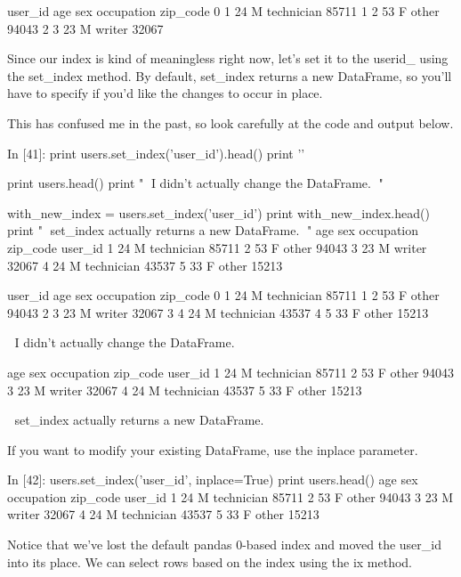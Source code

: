    user_id  age sex  occupation zip_code
0        1   24   M  technician    85711
1        2   53   F       other    94043
2        3   23   M      writer    32067

Since our index is kind of meaningless right now, let's set it to the userid_ using the set_index method. By default, set_index returns a new DataFrame, so you'll have to specify if you'd like the changes to occur in place.

This has confused me in the past, so look carefully at the code and output below.

In [41]:
print users.set_index('user_id').head()
print '\n'

print users.head()
print "\n^^^ I didn't actually change the DataFrame. ^^^\n"

with_new_index = users.set_index('user_id')
print with_new_index.head()
print "\n^^^ set_index actually returns a new DataFrame. ^^^\n"
         age sex  occupation zip_code
user_id                              
1         24   M  technician    85711
2         53   F       other    94043
3         23   M      writer    32067
4         24   M  technician    43537
5         33   F       other    15213


   user_id  age sex  occupation zip_code
0        1   24   M  technician    85711
1        2   53   F       other    94043
2        3   23   M      writer    32067
3        4   24   M  technician    43537
4        5   33   F       other    15213

^^^ I didn't actually change the DataFrame. ^^^

         age sex  occupation zip_code
user_id                              
1         24   M  technician    85711
2         53   F       other    94043
3         23   M      writer    32067
4         24   M  technician    43537
5         33   F       other    15213

^^^ set_index actually returns a new DataFrame. ^^^


If you want to modify your existing DataFrame, use the inplace parameter.

In [42]:
users.set_index('user_id', inplace=True)
print users.head()
         age sex  occupation zip_code
user_id                              
1         24   M  technician    85711
2         53   F       other    94043
3         23   M      writer    32067
4         24   M  technician    43537
5         33   F       other    15213

Notice that we've lost the default pandas 0-based index and moved the user_id into its place. We can select rows based on the index using the ix method.

